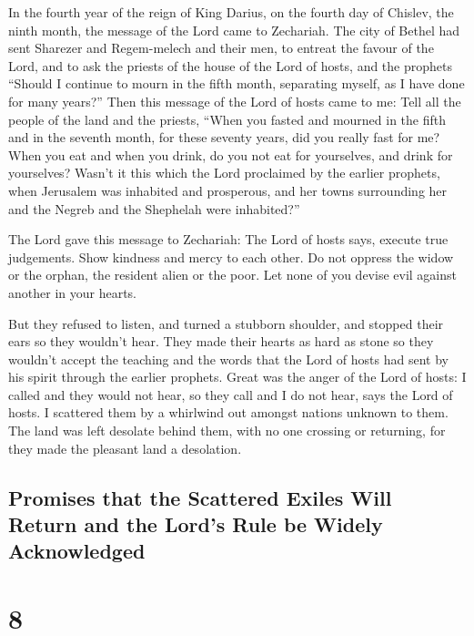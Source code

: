  In the fourth year of the reign of King Darius, on the
fourth day of Chislev, the ninth month, the message of the Lord came to
Zechariah.  The city of Bethel had sent Sharezer and
Regem-melech and their men, to entreat the favour of the Lord,
 and to ask the priests of the house of the Lord of hosts,
and the prophets ``Should I continue to mourn in the fifth month,
separating myself, as I have done for many years?''  Then
this message of the Lord of hosts came to me:  Tell all the
people of the land and the priests, ``When you fasted and mourned in the
fifth and in the seventh month, for these seventy years, did you really
fast for me?  When you eat and when you drink, do you not
eat for yourselves, and drink for yourselves?  Wasn't it
this which the Lord proclaimed by the earlier prophets, when Jerusalem
was inhabited and prosperous, and her towns surrounding her and the
Negreb and the Shephelah were inhabited?''

 The Lord gave this message to Zechariah:  The
Lord of hosts says, execute true judgements. Show kindness and mercy to
each other.  Do not oppress the widow or the orphan, the
resident alien or the poor. Let none of you devise evil against another
in your hearts.

 But they refused to listen, and turned a stubborn
shoulder, and stopped their ears so they wouldn't hear. 
They made their hearts as hard as stone so they wouldn't accept the
teaching and the words that the Lord of hosts had sent by his spirit
through the earlier prophets. Great was the anger of the Lord of hosts:
 I called and they would not hear, so they call and I do
not hear, says the Lord of hosts.  I scattered them by a
whirlwind out amongst nations unknown to them. The land was left
desolate behind them, with no one crossing or returning, for they made
the pleasant land a desolation.

\hypertarget{promises-that-the-scattered-exiles-will-return-and-the-lords-rule-be-widely-acknowledged}{%
\subsection{Promises that the Scattered Exiles Will Return and the
Lord's Rule be Widely
Acknowledged}\label{promises-that-the-scattered-exiles-will-return-and-the-lords-rule-be-widely-acknowledged}}

\hypertarget{section-7}{%
\section{8}\label{section-7}}

